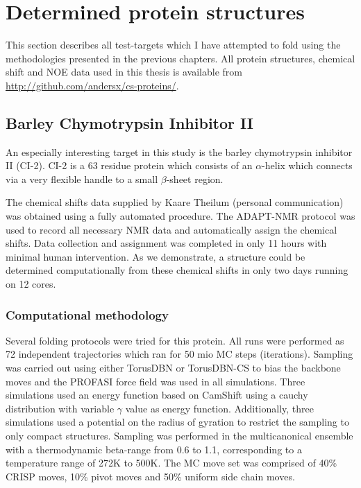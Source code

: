 \chapter{Determined protein structures}
\label{chapter:results}
This section describes all test-targets which I have attempted to fold using the methodologies presented in the previous chapters.
All protein structures, chemical shift and NOE data used in this thesis is available from \url{http://github.com/andersx/cs-proteins/}.


\section{Barley Chymotrypsin Inhibitor II}

An especially interesting target in this study is the barley chymotrypsin inhibitor II (CI-2). CI-2 is a 63 residue protein which consists of an $\alpha$-helix which connects via a very flexible handle to a small $\beta$-sheet region.

The chemical shifts data supplied by Kaare Theilum (personal communication) was obtained using a fully automated procedure.
The ADAPT-NMR \cite{adaptnmr} protocol was used to record all necessary NMR data and automatically assign the chemical shifts.
Data collection and assignment was completed in only 11 hours with minimal human intervention.
As we demonstrate, a structure could be determined computationally from these chemical shifts in only two days running on 12 cores.



\subsection{Computational methodology}
Several folding protocols were tried for this protein. All runs were performed as 72 independent trajectories which ran for 50 mio MC steps (iterations). Sampling was carried out using either TorusDBN or TorusDBN-CS to bias the backbone moves and the PROFASI force field was used in all simulations. Three simulations used an energy function based on CamShift using a cauchy distribution with variable $\gamma$ value as energy function. Additionally, three simulations used a potential on the radius of gyration to restrict the sampling to only compact structures. 
Sampling was performed in the multicanonical ensemble with a thermodynamic beta-range from 0.6 to 1.1, corresponding to a temperature range of 272K to 500K. The MC move set was comprised of 40\% CRISP moves, 10\% pivot moves and 50\% uniform side chain moves.


